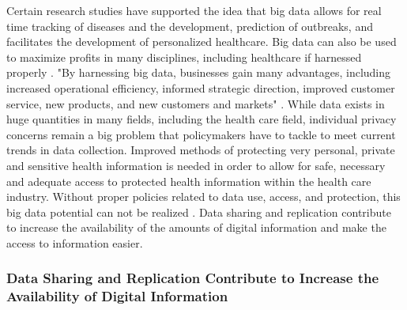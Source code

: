 \documentclass[sigconf]{acmart}
\begin{document}
Certain research studies have supported the idea that big data allows for real time tracking of diseases and the development, prediction of outbreaks, and facilitates the development of personalized healthcare. Big data can also be used to maximize profits in many disciplines, including healthcare if harnessed properly \cite{van2011health}. "By harnessing big data, businesses gain many advantages, including increased operational efficiency, informed strategic direction, improved customer service, new products, and new customers and markets" \cite{khan2014big}. While data exists in huge quantities in many fields, including the health care field, individual privacy concerns remain a big problem that policymakers have to tackle to meet current trends in data collection. Improved methods of protecting very personal, private and sensitive health information is needed in order to allow for safe, necessary and adequate access to protected health information within the health care industry. Without proper policies related to data use, access, and protection, this big data potential can not be realized \cite{roski2014creating}. Data sharing and replication contribute to increase the availability of the amounts of digital information and make the access to information easier. 


\subsubsection {Data Sharing and Replication Contribute to Increase the Availability of Digital Information}
\end{document}
